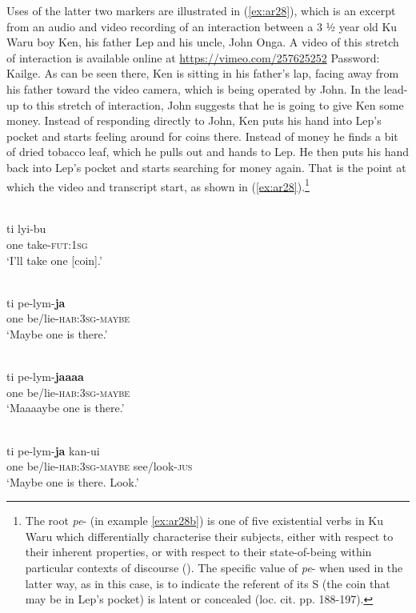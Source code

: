 \documentclass[output=paper]{langsci/langscibook}
\begin{document}
Uses of the latter two markers are illustrated in (\ref{ex:ar28}), which is an excerpt from an audio and video recording of an interaction between a 3 ½ year old Ku Waru boy Ken, his father Lep and his uncle, John Onga. A video of this stretch of interaction is available online at \url{https://vimeo.com/257625252} Password: Kailge. As can be seen there, Ken is sitting in his father’s lap, facing away from his father toward the video camera, which is being operated by John. In the lead-up to this stretch of interaction, John suggests that he is going to give Ken some money. Instead of responding directly to John, Ken puts his hand into Lep’s pocket and starts feeling around for coins there. Instead of money he finds a bit of dried tobacco leaf, which he pulls out and hands to Lep. He then puts his hand back into Lep’s pocket and starts searching for money again. That is the point at which the video and transcript start, as shown in (\ref{ex:ar28}).\footnote{The root \textit{pe}- (in example \ref{ex:ar28b}) is one of five existential verbs in Ku Waru which differentially characterise their subjects, either with respect to their inherent properties, or with respect to their state-of-being within particular contexts of discourse (\citealt{Rumsey2002}). The specific value of \textit{pe}- when used in the latter way, as in this case, is to indicate the referent of its S (the coin that may be in Lep’s pocket) is latent or concealed (loc. cit. pp. 188-197).}


\ea \label{ex:ar28}
	\ea \label{ex:ar28a}
	\\
	\gll ti lyi-bu\\
	one take-\textsc{fut}:1\textsc{sg}\\
	\glt ‘I’ll take one [coin].’
	
	\ex \label{ex:ar28b}
	\\
	\gll ti pe-lym-\textbf{ja}\\
	one be/lie-\textsc{hab}:3\textsc{sg}-\textsc{maybe}\\
	\glt ‘Maybe one is there.’
	
	\ex \label{ex:ar28c}
	\\
	\gll ti pe-lym-\textbf{jaaaa}\\
	one be/lie-\textsc{hab}:3\textsc{sg}-\textsc{maybe}\\
	\glt ‘Maaaaybe one is there.’
	
	\ex \label{ex:ar28d}
 	\\
	\gll ti pe-lym-\textbf{ja} kan-ui\\
	one be/lie-\textsc{hab}:3\textsc{sg}-\textsc{maybe} see/look-\textsc{jus}\\
	\glt ‘Maybe one is there. Look.’
	
\end{document}
